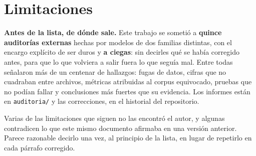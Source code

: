 \documentclass[11pt,a4paper]{article}
\newcommand{\cod}[1]{\texttt{\small #1}}
\begin{document}
\section{Limitaciones}
\label{sec:limitaciones}

\textbf{Antes de la lista, de dónde sale.} Este trabajo se sometió a \textbf{quince
auditorías externas} hechas por modelos de dos familias distintas, con el encargo
explícito de ser duros y \textbf{a ciegas}: sin decirles qué se había corregido antes,
para que lo que volviera a salir fuera lo que seguía mal. Entre todas señalaron más de
un centenar de hallazgos: fugas de datos, cifras que no cuadraban entre
archivos, métricas atribuidas al corpus equivocado, pruebas que no podían fallar y
conclusiones más fuertes que su evidencia. Los informes están en \cod{auditoria/} y las
correcciones, en el historial del repositorio.

Varias de las limitaciones que siguen no las encontró el autor, y algunas contradicen lo
que este mismo documento afirmaba en una versión anterior. Parece razonable decirlo una
vez, al principio de la lista, en lugar de repetirlo en cada párrafo corregido.
\end{document}

